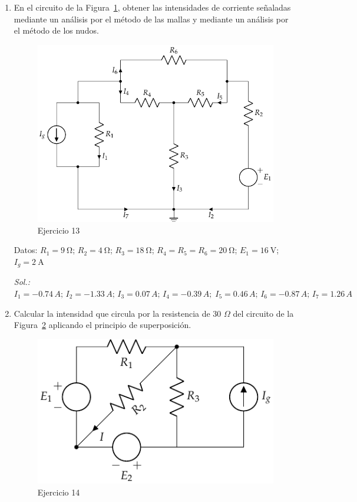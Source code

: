 \begin{enumerate}
\item En el circuito de la Figura~\ref{fig.ej12_BT1}, obtener las
  intensidades de corriente señaladas mediante un análisis por el
  método de las mallas y mediante un análisis por el método de los
  nudos.
  \begin{figure}[H]
    \centering \includegraphics{../figs/ej12_BT1.pdf}
    \caption{Ejercicio 13}
    \label{fig.ej12_BT1}
  \end{figure}

    Datos: $R_1 = \qty{9}{\ohm}$; $R_2 = \qty{4}{\ohm}$; $R_3 = \qty{18}{\ohm}$; $R_4 = R_5 = R_6 = \qty{20}{\ohm}$; $E_1 = \qty{16}{\volt}$; $I_g = \qty{2}{\ampere}$

  \emph{Sol.:
    $I_1=-0.74\,A;\,I_2=-1.33\,A;\,I_3=0.07\,A;\,I_4=-0.39\,A;\;I_5=0.46\,A;\,I_6=-0.87\,A;\,I_7=1.26\,A$}

\item Calcular la intensidad que circula por la resistencia de 30
  $\Omega$ del circuito de la Figura~\ref{fig.ej16_BT1} aplicando el
  principio de superposición.
  \begin{figure}[H]
    \centering \includegraphics{../figs/ej16_BT1.pdf}
    \caption{Ejercicio 14}
    \label{fig.ej16_BT1}
  \end{figure}


\end{enumerate}
